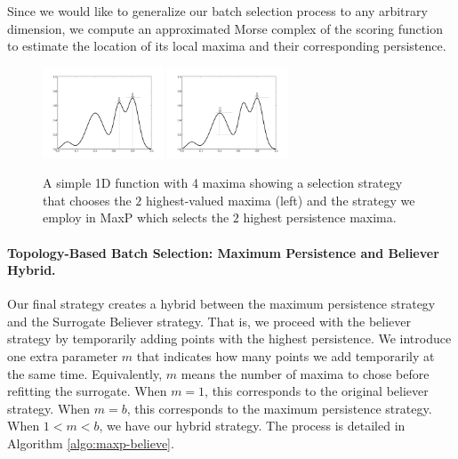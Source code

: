 Since we would like to generalize our batch selection process to any arbitrary dimension, we compute an approximated Morse complex of the scoring function to estimate the location of its local maxima and their corresponding persistence.

\begin{figure}[!ht]
\centering
\includegraphics[width=0.32\textwidth]{figs/chap5/persistence}
\includegraphics[width=0.32\textwidth]{figs/chap5/persistence2}
\caption{A simple 1D function with 4 maxima showing a selection strategy that
chooses the $2$ highest-valued maxima (left) and the strategy we employ in MaxP
which selects the $2$ highest persistence maxima.}
\label{fig:persistence}
\end{figure}

\paragraph{Topology-Based Batch Selection: Maximum Persistence and Believer Hybrid.}
Our final strategy creates a hybrid between the maximum persistence strategy and the Surrogate Believer strategy.
%
That is, we proceed with the believer strategy by temporarily adding points with the highest persistence.
%
We introduce one extra parameter $m$ that indicates how many points we add temporarily at the same time.
%
Equivalently, $m$ means the number of maxima to chose before refitting the surrogate.
%
When $m=1$, this corresponds to the original believer strategy.
%
When $m = b$, this corresponds to the maximum persistence strategy.
%
When $1 < m < b$, we have our hybrid strategy.
%
The process is detailed in Algorithm \ref{algo:maxp-believe}.

